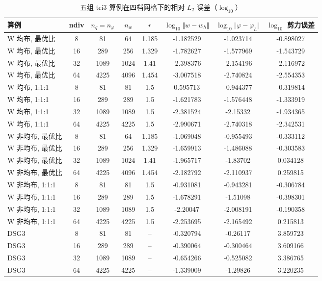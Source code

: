 \begin{table}[htbp]
    \centering
    \caption{五组 tri3 算例在四档网格下的相对 $L_2$ 误差（$\log_{10}$）}
    \label{tab:tri3-5cases}
    \small
\renewcommand{\arraystretch}{1.25}
\setlength{\tabcolsep}{5pt}
\begin{tabular}{@{}lccccccc@{}}
\toprule[1.0pt]
算例 & ndiv & $n_q=n_\varphi$ & $n_w$ & $r$ & $\log_{10}\Vert w-w_h\Vert$ & $\log_{10}\Vert\varphi-\varphi_h\Vert$ & $\log_{10}$ 剪力误差 \\
\midrule[0.5pt]
W 均布, 最优比 & 8 & 81 & 64 & 1.185 & -1.182529 & -1.023714 & -0.898027 \\
W 均布, 最优比 & 16 & 289 & 256 & 1.329 & -1.782627 & -1.577969 & -1.543729 \\
W 均布, 最优比 & 32 & 1089 & 1024 & 1.41 & -2.398376 & -2.154196 & -2.116972 \\
W 均布, 最优比 & 64 & 4225 & 4096 & 1.454 & -3.007518 & -2.740824 & -2.554353 \\
\midrule[0.5pt]
W 均布, 1:1:1 & 8 & 81 & 81 & 1.5 & 0.595713 & -0.944377 & -0.319814 \\
W 均布, 1:1:1 & 16 & 289 & 289 & 1.5 & -1.621783 & -1.576448 & -1.333919 \\
W 均布, 1:1:1 & 32 & 1089 & 1089 & 1.5 & -2.381524 & -2.15332 & -1.934365 \\
W 均布, 1:1:1 & 64 & 4225 & 4225 & 1.5 & -2.990671 & -2.740318 & -2.342531 \\
\midrule[0.5pt]
W 非均布, 最优比 & 8 & 81 & 64 & 1.185 & -1.069048 & -0.955493 & -0.333112 \\
W 非均布, 最优比 & 16 & 289 & 256 & 1.329 & -1.659913 & -1.486088 & -0.303583 \\
W 非均布, 最优比 & 32 & 1089 & 1024 & 1.41 & -1.965717 & -1.83702 & 0.034128 \\
W 非均布, 最优比 & 64 & 4225 & 4096 & 1.454 & -2.182792 & -2.110937 & 0.259815 \\
\midrule[0.5pt]
W 非均布, 1:1:1 & 8 & 81 & 81 & 1.5 & -0.931081 & -0.943281 & -0.306784 \\
W 非均布, 1:1:1 & 16 & 289 & 289 & 1.5 & -1.678291 & -1.51098 & -0.398301 \\
W 非均布, 1:1:1 & 32 & 1089 & 1089 & 1.5 & -2.20047 & -2.008191 & -0.190358 \\
W 非均布, 1:1:1 & 64 & 4225 & 4225 & 1.5 & -2.253695 & -2.165492 & 0.215813 \\
\midrule[0.5pt]
DSG3 & 8 & 81 & 81 & -- & -0.320794 & -0.26117 & 3.859723 \\
DSG3 & 16 & 289 & 289 & -- & -0.390064 & -0.300464 & 3.609166 \\
DSG3 & 32 & 1089 & 1089 & -- & -0.654266 & -0.525082 & 3.386765 \\
DSG3 & 64 & 4225 & 4225 & -- & -1.339009 & -1.29826 & 3.220235 \\
\bottomrule[1.0pt]
\end{tabular}


\end{table}
